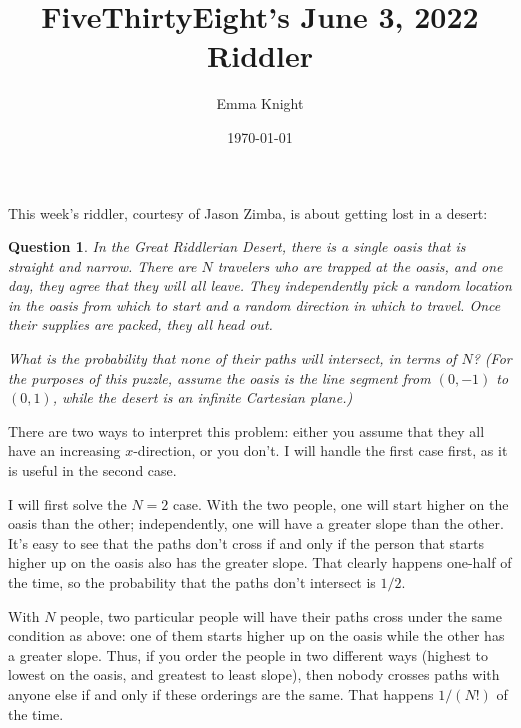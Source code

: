 \documentclass[11pt]{article}
\title{FiveThirtyEight's June 3, 2022 Riddler}
\author{Emma Knight}
\date{\today}
\newtheorem{question}[theorem]{Question}
\theoremstyle{definition}
\begin{document}
\maketitle
This week's riddler, courtesy of Jason Zimba, is about getting lost in a desert:
\begin{question}
In the Great Riddlerian Desert, there is a single oasis that is straight and narrow. There are $N$ travelers who are trapped at the oasis, and one day, they agree that they will all leave. They independently pick a random location in the oasis from which to start and a random direction in which to travel. Once their supplies are packed, they all head out.

What is the probability that none of their paths will intersect, in terms of $N$? (For the purposes of this puzzle, assume the oasis is the line segment from $(0, -1)$ to $(0, 1)$, while the desert is an infinite Cartesian plane.)
\end{question}
There are two ways to interpret this problem: either you assume that they all have an increasing $x$-direction, or you don't.  I will handle the first case first, as it is useful in the second case.

I will first solve the $N = 2$ case.  With the two people, one will start higher on the oasis than the other; independently, one will have a greater slope than the other.  It's easy to see that the paths don't cross if and only if the person that starts higher up on the oasis also has the greater slope.  That clearly happens one-half of the time, so the probability that the paths don't intersect is $1/2$.

With $N$ people, two particular people will have their paths cross under the same condition as above: one of them starts higher up on the oasis while the other has a greater slope.  Thus, if you order the people in two different ways (highest to lowest on the oasis, and greatest to least slope), then nobody crosses paths with anyone else if and only if these orderings are the same.  That happens $1/(N!)$ of the time.
\end{document}
